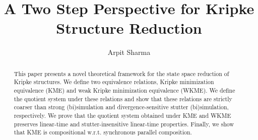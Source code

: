 \documentclass{llncs}
\newcommand{\<}{\langle}
\renewcommand{\>}{\rangle}
\begin{document}
\title{A Two Step Perspective for Kripke Structure Reduction}








\author{Arpit Sharma}
\maketitle
\begin{abstract}
This paper presents a novel theoretical framework for the state space reduction of Kripke structures. We define two equivalence relations, Kripke minimization equivalence (KME) and weak Kripke minimization equivalence (WKME). We define the quotient system under these relations and show that these relations are strictly coarser than strong (bi)simulation and divergence-sensitive stutter (bi)simulation, respectively. We prove that the quotient system obtained under KME and WKME preserves linear-time and stutter-insensitive linear-time properties. Finally, we show that KME is compositional w.r.t. synchronous parallel composition.      
\end{abstract}
\end{document}
